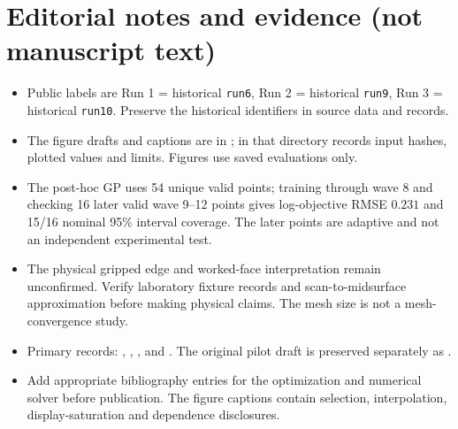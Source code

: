 \documentclass[11pt]{article}
\begin{document}
\section*{Editorial notes and evidence (not manuscript text)}
\begin{itemize}
\item Public labels are Run 1 = historical \texttt{run6}, Run 2 = historical \texttt{run9}, Run 3 = historical \texttt{run10}. Preserve the historical identifiers in source data and records.
\item The figure drafts and captions are in ;  in that directory records input hashes, plotted values and limits. Figures use saved evaluations only.
\item The post-hoc GP uses 54 unique valid points; training through wave 8 and checking 16 later valid wave 9--12 points gives log-objective RMSE $0.231$ and 15/16 nominal 95\% interval coverage. The later points are adaptive and not an independent experimental test.
\item The physical gripped edge and worked-face interpretation remain unconfirmed. Verify laboratory fixture records and scan-to-midsurface approximation before making physical claims. The mesh size is not a mesh-convergence study.
\item Primary records: , , , and . The original pilot draft is preserved separately as .
\item Add appropriate bibliography entries for the optimization and numerical solver before publication. The figure captions contain selection, interpolation, display-saturation and dependence disclosures.
\end{itemize}
\end{document}
